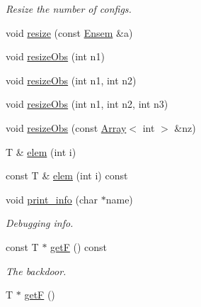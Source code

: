 \begin{DoxyCompactItemize}
\begin{DoxyCompactList}\small\item\em Resize the number of configs. \end{DoxyCompactList}\item 
void \mbox{\hyperlink{classENSEM_1_1Ensem_acf1e1629e4e10dbd254d81d14271b763}{resize}} (const \mbox{\hyperlink{classENSEM_1_1Ensem}{Ensem}} \&a)
\item 
void \mbox{\hyperlink{classENSEM_1_1Ensem_a20ee27dffc4b1db635103ce40fb0d5c2}{resize\+Obs}} (int n1)
\item 
void \mbox{\hyperlink{classENSEM_1_1Ensem_af74074307267e421a53a3e9e9e2449fc}{resize\+Obs}} (int n1, int n2)
\item 
void \mbox{\hyperlink{classENSEM_1_1Ensem_a8d63351cad23f2af13f26c7326d1abcf}{resize\+Obs}} (int n1, int n2, int n3)
\item 
void \mbox{\hyperlink{classENSEM_1_1Ensem_a4acf05018e5c49c0053dbe8cf76a4252}{resize\+Obs}} (const \mbox{\hyperlink{classXMLArray_1_1Array}{Array}}$<$ int $>$ \&nz)
\item 
T \& \mbox{\hyperlink{classENSEM_1_1Ensem_a4927ebde99b1f0a03cdcfe3fc88458a5}{elem}} (int i)
\item 
const T \& \mbox{\hyperlink{classENSEM_1_1Ensem_a03e45aba3d9addb16e117debbc4e1a33}{elem}} (int i) const
\item 
void \mbox{\hyperlink{classENSEM_1_1Ensem_a85302bace1110e35249c88486f88d80c}{print\+\_\+info}} (char $\ast$name)
\begin{DoxyCompactList}\small\item\em Debugging info. \end{DoxyCompactList}\item 
const T $\ast$ \mbox{\hyperlink{classENSEM_1_1Ensem_ad2cb7a34934bedeaa29f49c78cdb8371}{getF}} () const
\begin{DoxyCompactList}\small\item\em The backdoor. \end{DoxyCompactList}\item 
T $\ast$ \mbox{\hyperlink{classENSEM_1_1Ensem_ab2909a7d9b171d7e2ba7365c5e962aa6}{getF}} ()
\end{DoxyCompactItemize}
